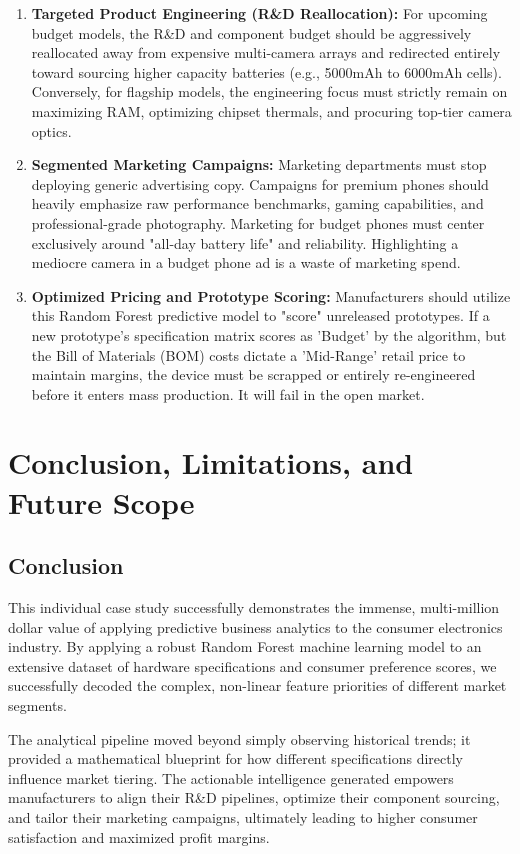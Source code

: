 \documentclass[12pt,a4paper]{article}
\begin{document}
\begin{enumerate}
    \item \textbf{Targeted Product Engineering (R\&D Reallocation):} For upcoming budget models, the R\&D and component budget should be aggressively reallocated away from expensive multi-camera arrays and redirected entirely toward sourcing higher capacity batteries (e.g., 5000mAh to 6000mAh cells). Conversely, for flagship models, the engineering focus must strictly remain on maximizing RAM, optimizing chipset thermals, and procuring top-tier camera optics.
    \item \textbf{Segmented Marketing Campaigns:} Marketing departments must stop deploying generic advertising copy. Campaigns for premium phones should heavily emphasize raw performance benchmarks, gaming capabilities, and professional-grade photography. Marketing for budget phones must center exclusively around "all-day battery life" and reliability. Highlighting a mediocre camera in a budget phone ad is a waste of marketing spend.
    \item \textbf{Optimized Pricing and Prototype Scoring:} Manufacturers should utilize this Random Forest predictive model to "score" unreleased prototypes. If a new prototype's specification matrix scores as 'Budget' by the algorithm, but the Bill of Materials (BOM) costs dictate a 'Mid-Range' retail price to maintain margins, the device must be scrapped or entirely re-engineered before it enters mass production. It will fail in the open market.
\end{enumerate}

\section{Conclusion, Limitations, and Future Scope}

\subsection{Conclusion}
This individual case study successfully demonstrates the immense, multi-million dollar value of applying predictive business analytics to the consumer electronics industry. By applying a robust Random Forest machine learning model to an extensive dataset of hardware specifications and consumer preference scores, we successfully decoded the complex, non-linear feature priorities of different market segments. 

The analytical pipeline moved beyond simply observing historical trends; it provided a mathematical blueprint for how different specifications directly influence market tiering. The actionable intelligence generated empowers manufacturers to align their R\&D pipelines, optimize their component sourcing, and tailor their marketing campaigns, ultimately leading to higher consumer satisfaction and maximized profit margins.
\end{document}
